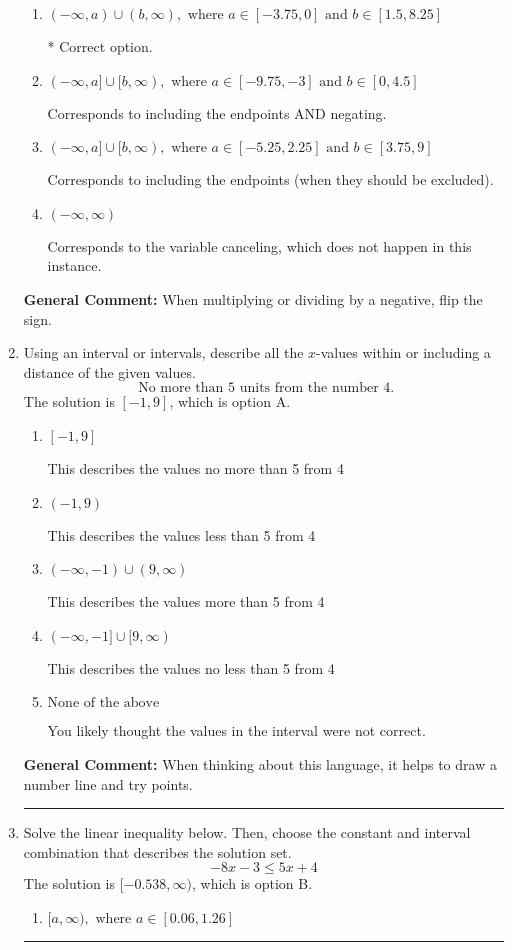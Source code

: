 \documentclass{extbook}[14pt]
\newcommand{\litem}[1]{\item #1

\rule{\textwidth}{0.4pt}}
\begin{document}
\begin{enumerate}
{\begin{enumerate}[label=\Alph*.]
Corresponds to inverting the inequality and negating the solution.
\item \( (-\infty, a) \cup (b, \infty), \text{ where } a \in [-3.75, 0] \text{ and } b \in [1.5, 8.25] \)

 * Correct option.
\item \( (-\infty, a] \cup [b, \infty), \text{ where } a \in [-9.75, -3] \text{ and } b \in [0, 4.5] \)

Corresponds to including the endpoints AND negating.
\item \( (-\infty, a] \cup [b, \infty), \text{ where } a \in [-5.25, 2.25] \text{ and } b \in [3.75, 9] \)

Corresponds to including the endpoints (when they should be excluded).
\item \( (-\infty, \infty) \)

Corresponds to the variable canceling, which does not happen in this instance.
\end{enumerate}

\textbf{General Comment:} When multiplying or dividing by a negative, flip the sign.
}
\litem{
Using an interval or intervals, describe all the $x$-values within or including a distance of the given values.
\[ \text{ No more than } 5 \text{ units from the number } 4. \]The solution is \( [-1, 9] \), which is option A.\begin{enumerate}[label=\Alph*.]
\item \( [-1, 9] \)

This describes the values no more than 5 from 4
\item \( (-1, 9) \)

This describes the values less than 5 from 4
\item \( (-\infty, -1) \cup (9, \infty) \)

This describes the values more than 5 from 4
\item \( (-\infty, -1] \cup [9, \infty) \)

This describes the values no less than 5 from 4
\item \( \text{None of the above} \)

You likely thought the values in the interval were not correct.
\end{enumerate}

\textbf{General Comment:} When thinking about this language, it helps to draw a number line and try points.
}
\litem{
Solve the linear inequality below. Then, choose the constant and interval combination that describes the solution set.
\[ -8x -3 \leq 5x + 4 \]The solution is \( [-0.538, \infty) \), which is option B.\begin{enumerate}[label=\Alph*.]
\item \( [a, \infty), \text{ where } a \in [0.06, 1.26] \)


\end{enumerate}}
\end{enumerate}
\end{document}
